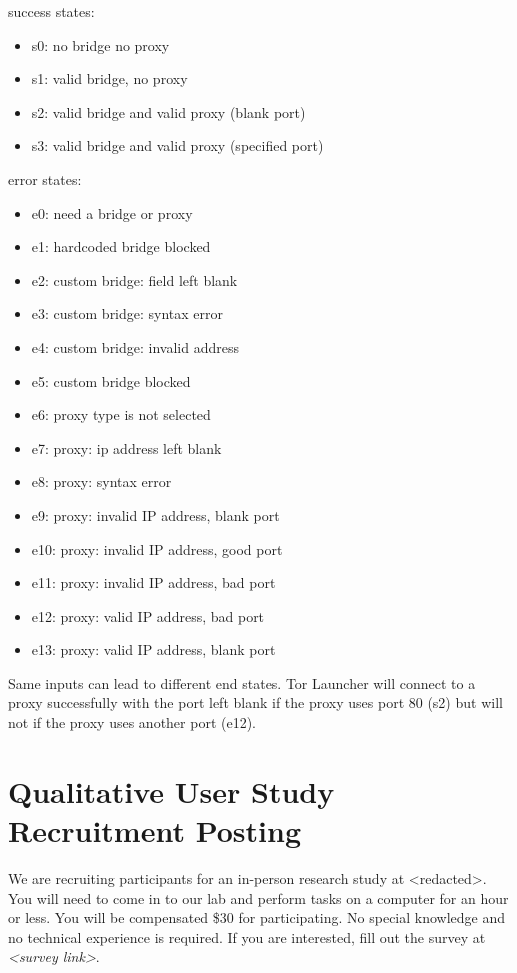 \documentclass[USenglish,oneside,twocolumn]{article}
\begin{document}
\noindent success states: 
\begin{itemize}
\item s0: no bridge no proxy
\item s1: valid bridge, no proxy
\item s2: valid bridge and valid proxy (blank port)
\item s3: valid bridge and valid proxy (specified port)
\end{itemize}

error states:
\begin{itemize} 
\item e0: need a bridge or proxy
\item e1: hardcoded bridge blocked
\item e2: custom bridge: field left blank
\item e3: custom bridge: syntax error
\item e4: custom bridge: invalid address
\item e5: custom bridge blocked
\item e6: proxy type is not selected
\item e7: proxy: ip address left blank
\item e8: proxy: syntax error
\item e9: proxy: invalid IP address, blank port
\item e10: proxy: invalid IP address, good port
\item e11: proxy: invalid IP address, bad port
\item e12: proxy: valid IP address, bad port
\item e13: proxy: valid IP address, blank port
\end{itemize} 

Same inputs can lead to different end states. Tor Launcher will connect to a proxy successfully with the port left blank if the proxy uses port 80 (s2) but will not if the proxy uses another port (e12). 

\section{Qualitative User Study Recruitment Posting} 
\label{qualitative-recruitment}
We are recruiting participants for an in-person research study at <redacted>. %
You will need to come in to our lab and perform tasks on a computer for an hour or less. You will be compensated \$30 for participating. 
No special knowledge and no technical experience is required. If you are interested, fill out the survey at \textit{<survey link>}. 
\end{document}
